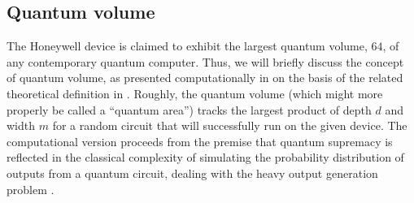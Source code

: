 \documentclass[12pt,a4paper]{amsart}
\numberwithin{equation}{section}
\theoremstyle{plain}
\theoremstyle{definition}
\begin{document}












\subsection{Quantum volume}


The Honeywell device is claimed to exhibit the largest quantum volume, $64$, of any contemporary quantum computer. Thus, we will briefly discuss the concept of quantum volume, as presented computationally in \cite{randBencVolu} on the basis of the related theoretical definition in \cite{Moll}. Roughly, the quantum volume (which might more properly be called a ``quantum area'') tracks the largest product of depth $d$ and width $m$ for a random circuit that will successfully run on the given device. The computational version proceeds from the premise that quantum supremacy is reflected in the classical complexity of simulating the probability distribution of outputs from a quantum circuit, dealing with the heavy output generation problem  \cite{randBencSupr}.
\end{document}

